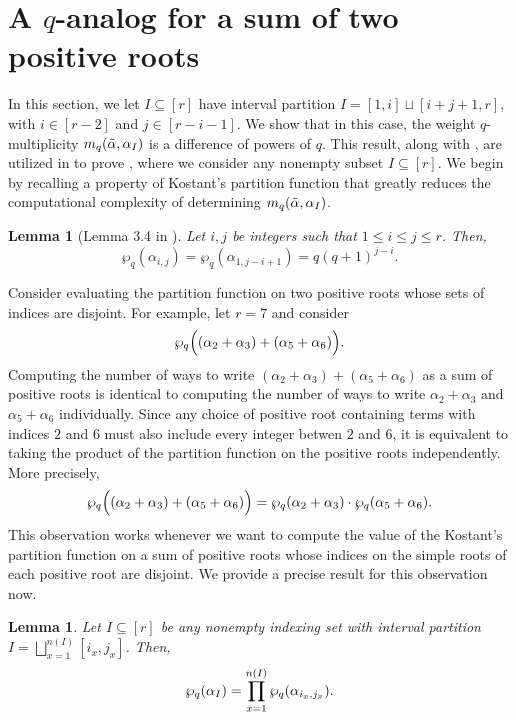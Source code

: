 \documentclass[10pt]{article}
\newtheorem{lemma}[theorem]{Lemma}
\newcommand{\hr}[0]{\Tilde{\alpha}}
\newcommand{\qpartition}[1]{\wp_q\left(#1\right)}
\begin{document}
\section{A $q$-analog for a sum of two positive roots }\label{section: 3 q-analogs of 101}
In this section, we let $I\subseteq[r]$ have interval partition $I=[1,i]\sqcup[i+j+1,r]$, with $i\in[r-2]$ and $j\in [r-i-1]$.   
We show that in this case, the weight $q$-multiplicity $m_q(\hr,\alpha_I)$ 
is a difference of powers of $q$. 
This result, along with , are utilized in  to prove , where we consider any  nonempty subset $I\subseteq[r]$. 
We begin by recalling a property of Kostant's partition function that greatly reduces the computational complexity of determining $m_q(\hr,\alpha_I)$. 
\begin{lemma}[Lemma 3.4 in \cite{harry2024computingqmultiplicitypositiveroots}]
    \label{lemma: rescaling q partition is cool}
    Let $i,j$ be integers such that $1\leq i \leq j\leq r$. Then,
    \[\wp_q(\alpha_{i,j})=\qpartition{\alpha_{1,j-i+1}}=q(q+1)^{j-i}.\]
\end{lemma}
Consider evaluating the partition function on two positive roots whose sets of indices are disjoint. 
For example, let $r=7$ and consider 
\begin{equation}
    \wp_q\Big((\alpha_2+\alpha_3)+(\alpha_5+\alpha_6)\Big).\notag
\end{equation}
Computing the number of ways to write  $(\alpha_2+\alpha_3)+(\alpha_5+\alpha_6)$ as a sum of positive roots is identical to computing the number of ways to write $\alpha_2+\alpha_3$ and $\alpha_5+\alpha_6$ individually. Since any choice of positive root containing terms with indices $2$ and $6$ must also include every integer betwen $2$ and $6$, it is equivalent to taking the product of the partition function on the positive roots independently. More precisely,
\begin{equation}
    \wp_q\Big((\alpha_2+\alpha_3)+(\alpha_5+\alpha_6)\Big)=\wp_q(\alpha_2+\alpha_3)\cdot \wp_q(\alpha_5+\alpha_6).\notag
\end{equation}
This observation works whenever we want to compute the value of the Kostant's partition function on a sum of positive roots whose indices on the simple roots of each positive root are disjoint. We provide a precise result for this observation now.
\begin{lemma}\label{lemma: split up partition function}
    Let $I\subseteq [r]$ be any nonempty indexing set with interval partition $I=\bigsqcup_{x=1}^{n(I)}[i_x,j_x]$. Then,
    \begin{equation}
        \wp_q(\alpha_I) = \prod_{x=1}^{n(I)}\wp_q(\alpha_{i_x,j_x}).\notag
    \end{equation}
\end{lemma}
\end{document}
